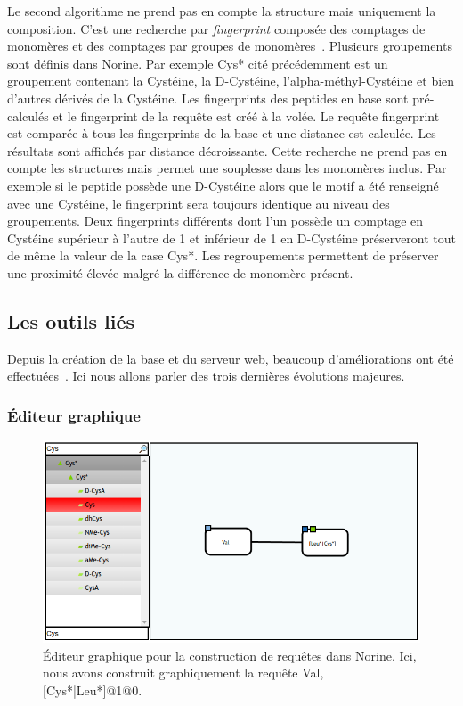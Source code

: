 Le second algorithme ne prend pas en compte la structure mais uniquement la composition.
C'est une recherche par \textit{fingerprint} composée des comptages de monomères et des comptages par groupes de monomères~\cite{abdo_new_2012}.
Plusieurs groupements sont définis dans Norine.
Par exemple Cys* cité précédemment est un groupement contenant la Cystéine, la D-Cystéine, l'alpha-méthyl-Cystéine et bien d'autres dérivés de la Cystéine.
Les fingerprints des peptides en base sont pré-calculés et le fingerprint de la requête est créé à la volée.
Le requête fingerprint est comparée à tous les fingerprints de la base et une distance est calculée.
Les résultats sont affichés par distance décroissante.
Cette recherche ne prend pas en compte les structures mais permet une souplesse dans les monomères inclus.
Par exemple si le peptide possède une D-Cystéine alors que le motif a été renseigné avec une Cystéine, le fingerprint sera toujours identique au niveau des groupements.
Deux fingerprints différents dont l'un possède un comptage en Cystéine supérieur à l'autre de 1 et inférieur de 1 en D-Cystéine préserveront tout de même la valeur de la case Cys*.
Les regroupements permettent de préserver une proximité élevée malgré la différence de monomère présent.



\subsection{Les outils liés}

Depuis la création de la base et du serveur web, beaucoup d'améliorations ont été effectuées~\cite{flissi_norine_2016}.
Ici nous allons parler des trois dernières évolutions majeures.


\subsubsection{Éditeur graphique}

\begin{figure}[h!]
  \begin{center}
    \includegraphics[width=450px]{Figures/Norine/editor.png}
    \caption{\label{editor}Éditeur graphique pour la construction de requêtes dans Norine.
    Ici, nous avons construit graphiquement la requête Val,[Cys*|Leu*]@1@0.}
  \end{center}
\end{figure}

